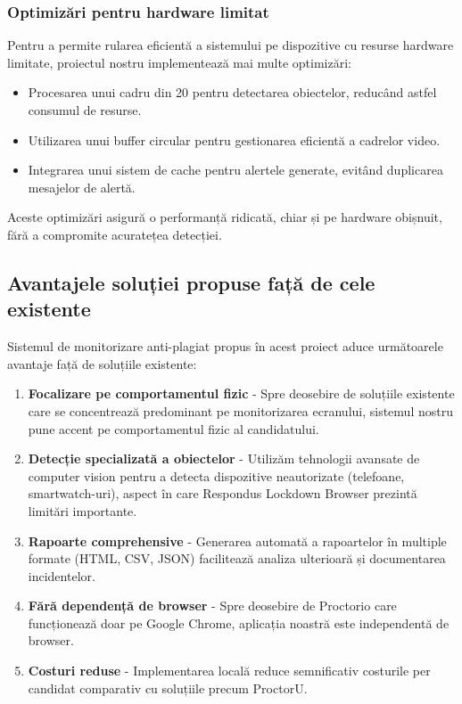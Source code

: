 \documentclass[12pt,a4paper]{article}
\begin{document}
\subsubsection{Optimizări pentru hardware limitat}
Pentru a permite rularea eficientă a sistemului pe dispozitive cu resurse hardware limitate, proiectul nostru implementează mai multe optimizări:
\begin{itemize}
    \item Procesarea unui cadru din 20 pentru detectarea obiectelor, reducând astfel consumul de resurse.
    \item Utilizarea unui buffer circular pentru gestionarea eficientă a cadrelor video.
    \item Integrarea unui sistem de cache pentru alertele generate, evitând duplicarea mesajelor de alertă.
\end{itemize}
Aceste optimizări asigură o performanță ridicată, chiar și pe hardware obișnuit, fără a compromite acuratețea detecției.

\subsection{Avantajele soluției propuse față de cele existente}

Sistemul de monitorizare anti-plagiat propus în acest proiect aduce următoarele avantaje față de soluțiile existente:

\begin{enumerate}
    \item \textbf{Focalizare pe comportamentul fizic} - Spre deosebire de soluțiile existente care se concentrează predominant pe monitorizarea ecranului, sistemul nostru pune accent pe comportamentul fizic al candidatului.
    
    \item \textbf{Detecție specializată a obiectelor} - Utilizăm tehnologii avansate de computer vision pentru a detecta dispozitive neautorizate (telefoane, smartwatch-uri), aspect în care Respondus Lockdown Browser prezintă limitări importante.
    
    \item \textbf{Rapoarte comprehensive} - Generarea automată a rapoartelor în multiple formate (HTML, CSV, JSON) facilitează analiza ulterioară și documentarea incidentelor.
    
    \item \textbf{Fără dependență de browser} - Spre deosebire de Proctorio care funcționează doar pe Google Chrome, aplicația noastră este independentă de browser.
    
    \item \textbf{Costuri reduse} - Implementarea locală reduce semnificativ costurile per candidat comparativ cu soluțiile precum ProctorU.
\end{enumerate}
\end{document}
